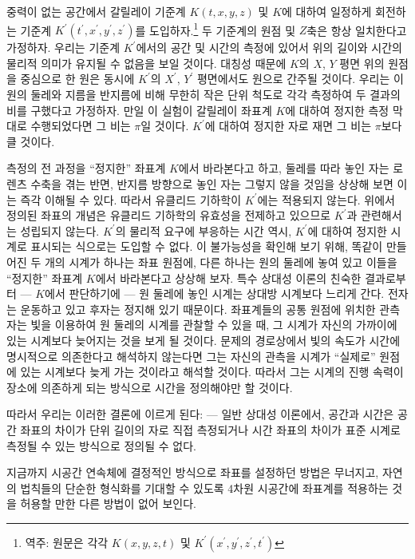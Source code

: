 중력이 없는 공간에서 갈릴레이 기준계 $K(t, x, y, z)$ 및 $K$에 대하여 일정하게 회전하는 기준계 $K^{\prime}(t^{\prime}, x^{\prime}, y^{\prime}, z^{\prime})$를 도입하자.\footnote{역주: 원문은 각각 $K(x, y, z, t)$ 및 $K^{\prime}(x^{\prime}, y^{\prime}, z^{\prime}, t^{\prime})$} 두 기준계의 원점 및 $Z$축은 항상 일치한다고 가정하자. 우리는 기준계 $K^{\prime}$에서의 공간 및 시간의 측정에 있어서 위의 길이와 시간의 물리적 의미가 유지될 수 없음을 보일 것이다. 대칭성 때문에 $K$의 $X$, $Y$ 평면 위의 원점을 중심으로 한 원은 동시에 $K^{\prime}$의 $X^{\prime}$, $Y^{\prime}$ 평면에서도 원으로 간주될 것이다. 우리는 이 원의 둘레와 지름을 반지름에 비해 무한히 작은 단위 척도로 각각 측정하여 두 결과의 비를 구했다고 가정하자. 만일 이 실험이 갈릴레이 좌표계 $K$에 대하여 정지한 측정 막대로 수행되었다면 그 비는 $\pi$일 것이다. $K^{\prime}$에 대하여 정지한 자로 재면 그 비는 $\pi$보다 클 것이다.

측정의 전 과정을 ``정지한'' 좌표계 $K$에서 바라본다고 하고, 둘레를 따라 놓인 자는 로렌츠 수축을  겪는 반면, 반지름 방향으로 놓인 자는 그렇지 않을 것임을 상상해 보면 이는 즉각 이해될 수 있다. 따라서 유클리드 기하학이 $K^{\prime}$에는 적용되지 않는다. 위에서 정의된 좌표의 개념은 유클리드 기하학의 유효성을 전제하고 있으므로 $K^{\prime}$과 관련해서는 성립되지 않는다. $K^{\prime}$의 물리적 요구에 부응하는 시간 역시, $K^{\prime}$에 대하여 정지한 시계로 표시되는 식으로는 도입할 수 없다. 이 불가능성을 확인해 보기 위해, 똑같이 만들어진 두 개의 시계가 하나는 좌표 원점에, 다른 하나는 원의 둘레에 놓여 있고 이들을 ``정지한'' 좌표계 $K$에서 바라본다고 상상해 보자. 특수 상대성 이론의 친숙한 결과로부터 --- $K$에서 판단하기에 --- 원 둘레에 놓인 시계는 상대방 시계보다 느리게 간다. 전자는 운동하고 있고 후자는 정지해 있기 때문이다. 좌표계들의 공통 원점에 위치한 관측자는 빛을 이용하여 원 둘레의 시계를 관찰할 수 있을 때, 그 시계가 자신의 가까이에 있는 시계보다 늦어지는 것을 보게 될 것이다. 문제의 경로상에서 빛의 속도가 시간에 명시적으로 의존한다고 해석하지 않는다면 그는 자신의 관측을 시계가 ``실제로'' 원점에 있는 시계보다 늦게 가는 것이라고 해석할 것이다. 따라서 그는 시계의 진행 속력이 장소에 의존하게 되는 방식으로 시간을 정의해야만 할 것이다.    

따라서 우리는 이러한 결론에 이르게 된다: --- 일반 상대성 이론에서, 공간과 시간은 공간 좌표의 차이가 단위 길이의 자로 직접 측정되거나 시간 좌표의 차이가 표준 시계로 측정될 수 있는 방식으로 정의될 수 없다.

지금까지 시공간 연속체에 결정적인 방식으로 좌표를 설정하던 방법은 무너지고, 자연의 법칙들의 단순한 형식화를 기대할 수 있도록 4차원 시공간에 좌표계를 적용하는 것을 허용할 만한 다른 방법이 없어 보인다.

